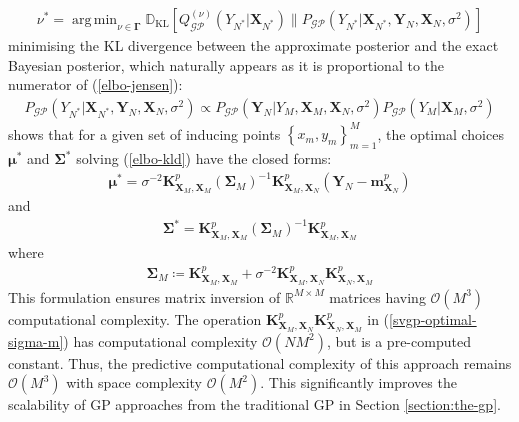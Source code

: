 \documentclass{article}
\newcommand{\KLD}{\operatorname{\mathbb{D}_{KL}}}
\newcommand{\GP}{\operatorname{\mathcal{GP}}}
\DeclareMathOperator*{\argmin}{arg\,min}
\numberwithin{equation}{section}
\begin{document}
\begin{align}
    \nu^* = \argmin_{\nu \in \mathbf{\Gamma}}\KLD \left[ Q_{\GP}^{(\nu)}\left(Y_{N^*} \vert \mathbf{X}_{N^*}\right) \Big\| P_{\GP}\left(Y_{N^*} \vert \mathbf{X}_{N^*}, \mathbf{Y}_N, \mathbf{X}_N, \sigma^2 \right) \right]
    \label{elbo-kld}
\end{align}
minimising the KL divergence between the approximate posterior and the exact Bayesian posterior, which naturally appears as it is proportional to the numerator of (\ref{elbo-jensen}):
\begin{align}
    P_{\GP}\left(Y_{N^*} \vert \mathbf{X}_{N^*}, \mathbf{Y}_N, \mathbf{X}_N, \sigma^2 \right) \propto P_{\GP}\left(\mathbf{Y}_N \vert Y_M,  \mathbf{X}_M, \mathbf{X}_N, \sigma^2\right) P_{\GP}\left( Y_M \vert \mathbf{X}_M, \sigma^2\right) 
    \label{bayes-posterior-prop}
\end{align}
\cite{titsias2009variational} shows that for a given set of inducing points $\left\{ x_m, y_m\right\}_{m=1}^M$, the optimal choices $\boldsymbol{\mu}^*$ and $\mathbf{\Sigma}^*$ solving (\ref{elbo-kld}) have the closed forms:
\begin{align}
    \label{svgp-optimal-mean}
    \boldsymbol{\mu}^* = \sigma^{-2}\mathbf{K}^p_{\mathbf{X}_M, \mathbf{X}_M}  \left(\mathbf{\Sigma}_M\right)^{-1}\mathbf{K}^p_{\mathbf{X}_M, \mathbf{X}_N}  \left(\mathbf{Y}_N - \mathbf{m}^p_{\mathbf{X}_N}\right)
\end{align}
and
\begin{align}
    \label{svgp-optimal-covariance}
    \mathbf{\Sigma}^* = \mathbf{K}^p_{\mathbf{X}_M, \mathbf{X}_M}  \left(\mathbf{\Sigma}_M\right)^{-1}\mathbf{K}^p_{\mathbf{X}_M, \mathbf{X}_M} 
\end{align}
where 
\begin{align}
    \mathbf{\Sigma}_M \coloneqq \mathbf{K}^p_{\mathbf{X}_M, \mathbf{X}_M}  + \sigma^{-2}\mathbf{K}^p_{\mathbf{X}_M, \mathbf{X}_N} \mathbf{K}^p_{\mathbf{X}_N, \mathbf{X}_M} 
    \label{svgp-optimal-sigma-m}
\end{align}
This formulation ensures matrix inversion of $\mathbb{R}^{M \times M}$ matrices having $\mathcal{O}\left(M^3\right)$ computational complexity. The operation $\mathbf{K}^p_{\mathbf{X}_M, \mathbf{X}_N} \mathbf{K}^p_{\mathbf{X}_N, \mathbf{X}_M} $ in (\ref{svgp-optimal-sigma-m}) has computational complexity $\mathcal{O}\left(NM^2\right)$, but is a pre-computed constant. Thus, the predictive computational complexity of this approach remains $\mathcal{O}\left(M^3\right)$ with space complexity $\mathcal{O}\left(M^2\right)$. This significantly improves the scalability of GP approaches from the traditional GP in Section \ref{section:the-gp}.
\end{document}
